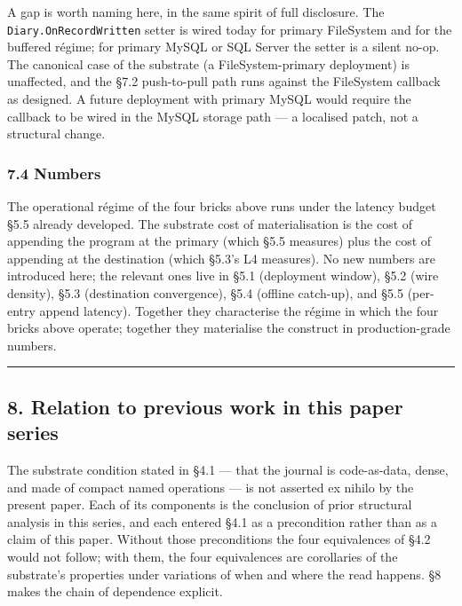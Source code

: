 \documentclass[
]{article}
\begin{document}
A gap is worth naming here, in the same spirit of full disclosure. The
\texttt{Diary.OnRecordWritten} setter is wired today for primary
FileSystem and for the buffered régime; for primary MySQL or SQL Server
the setter is a silent no-op. The canonical case of the substrate (a
FileSystem-primary deployment) is unaffected, and the §7.2 push-to-pull
path runs against the FileSystem callback as designed. A future
deployment with primary MySQL would require the callback to be wired in
the MySQL storage path --- a localised patch, not a structural change.

\subsubsection{7.4 Numbers}\label{numbers}

The operational régime of the four bricks above runs under the latency
budget §5.5 already developed. The substrate cost of materialisation is
the cost of appending the program at the primary (which §5.5 measures)
plus the cost of appending at the destination (which §5.3's L4
measures). No new numbers are introduced here; the relevant ones live in
§5.1 (deployment window), §5.2 (wire density), §5.3 (destination
convergence), §5.4 (offline catch-up), and §5.5 (per-entry append
latency). Together they characterise the régime in which the four bricks
above operate; together they materialise the construct in
production-grade numbers.

\begin{center}\rule{0.5\linewidth}{0.5pt}\end{center}

\subsection{8. Relation to previous work in this paper
series}\label{relation-to-previous-work-in-this-paper-series}

The substrate condition stated in §4.1 --- that the journal is
code-as-data, dense, and made of compact named operations --- is not
asserted ex nihilo by the present paper. Each of its components is the
conclusion of prior structural analysis in this series, and each entered
§4.1 as a precondition rather than as a claim of this paper. Without
those preconditions the four equivalences of §4.2 would not follow; with
them, the four equivalences are corollaries of the substrate's
properties under variations of when and where the read happens. §8 makes
the chain of dependence explicit.
\end{document}
